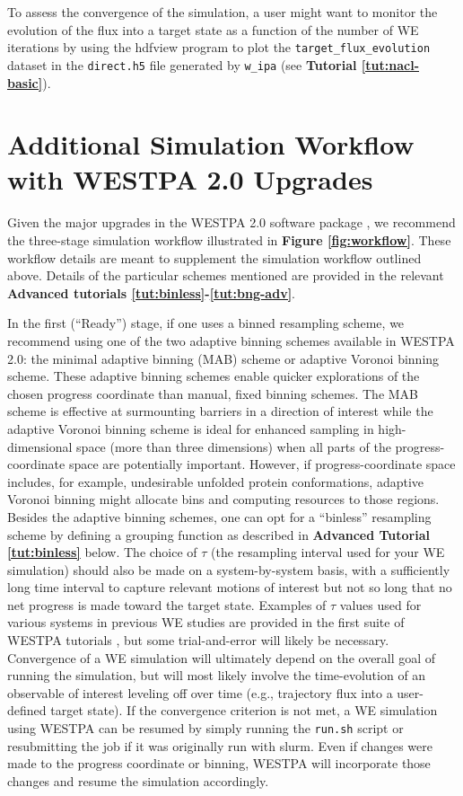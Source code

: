 To assess the convergence of the simulation, a user might want to monitor the evolution of the flux into a target state as a function of the number of WE iterations by using the hdfview program to plot the \verb|target_flux_evolution| dataset in the \verb|direct.h5| file generated by \verb|w_ipa| (see \textbf{Tutorial \ref{tut:nacl-basic}}). 
\vspace{-0.325cm}
\section{Additional Simulation Workflow with WESTPA 2.0 Upgrades}

Given the major upgrades in the WESTPA 2.0 software package \citep{russo_westpa_2022}, we recommend the three-stage simulation workflow illustrated in \textbf{Figure \ref{fig:workflow}}. 
These workflow details are meant to supplement the simulation workflow outlined above. 
Details of the particular schemes mentioned are provided in the relevant \textbf{Advanced tutorials \ref{tut:binless}-\ref{tut:bng-adv}}.

In the first (“Ready”) stage, if one uses a binned resampling scheme, we recommend using one of the two adaptive binning schemes available in WESTPA 2.0: the minimal adaptive binning (MAB) scheme or adaptive Voronoi binning scheme.
These adaptive binning schemes enable quicker explorations of the chosen progress coordinate than manual, fixed binning schemes. 
The MAB scheme is effective at surmounting barriers in a direction of interest \citep{torrillo_minimal_2021} while the adaptive Voronoi binning scheme \citep{zhang_exact_2010} is ideal for enhanced sampling in high-dimensional space (more than three dimensions) when all parts of the progress-coordinate space are potentially important. 
However, if progress-coordinate space includes, for example, undesirable unfolded protein conformations, adaptive Voronoi binning might allocate bins and computing resources to those regions. 
Besides the adaptive binning schemes, one can opt for a “binless” resampling scheme by defining a grouping function as described in \textbf{Advanced Tutorial \ref{tut:binless}} below. 
The choice of $\tau$ (the resampling interval used for your WE simulation) should also be made on a system-by-system basis, with a sufficiently long time interval to capture relevant motions of interest but not so long that no net progress is made toward the target state. 
Examples of $\tau$ values used for various systems in previous WE studies are provided in the first suite of WESTPA tutorials \citep{bogetti_suite_2019}, but some trial-and-error will likely be necessary.
Convergence of a WE simulation will ultimately depend on the overall goal of running the simulation, but will most likely involve the time-evolution of an observable of interest leveling off over time (e.g., trajectory flux into a user-defined target state). 
If the convergence criterion is not met, a WE simulation using WESTPA can be resumed by simply running the \verb|run.sh| script or resubmitting the job if it was originally run with slurm. 
Even if changes were made to the progress coordinate or binning, WESTPA will incorporate those changes and resume the simulation accordingly.

